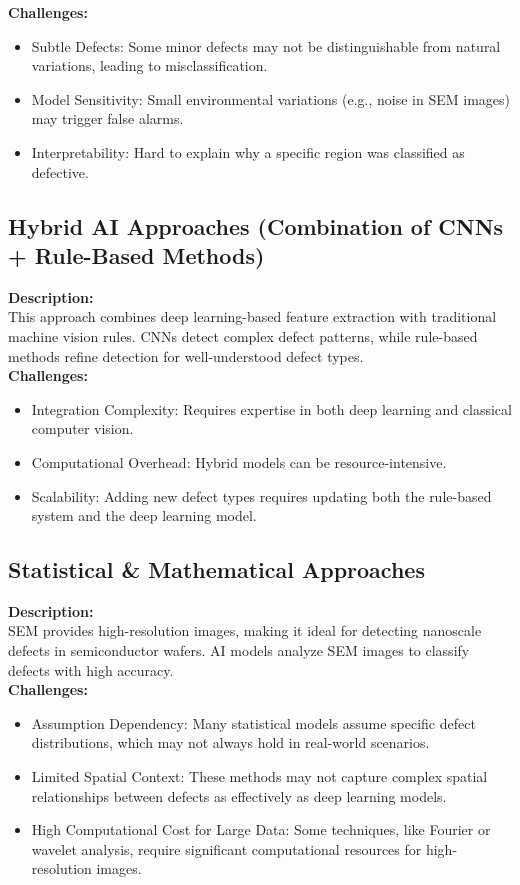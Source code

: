 \documentclass[12pt,oneside,letterpaper,english]{article}
\begin{document}
\textbf{Challenges:}
\begin{itemize}
	\item Subtle Defects: Some minor defects may not be distinguishable from natural variations, leading to misclassification.
	\item Model Sensitivity: Small environmental variations (e.g., noise in SEM images) may trigger false alarms.
	\item	Interpretability: Hard to explain why a specific region was classified as defective.
\end{itemize}

\subsection{Hybrid AI Approaches (Combination of CNNs + Rule-Based Methods)}
\textbf{Description:}\\
This approach combines deep learning-based feature extraction with traditional machine vision rules. CNNs detect complex defect patterns, while rule-based methods refine detection for well-understood defect types.\\

\textbf{Challenges:}
\begin{itemize}
	\item Integration Complexity: Requires expertise in both deep learning and classical computer vision.
	\item Computational Overhead: Hybrid models can be resource-intensive.
	\item Scalability: Adding new defect types requires updating both the rule-based system and the deep learning model.
\end{itemize}

\subsection{Statistical \& Mathematical Approaches}
\textbf{Description:}\\
SEM provides high-resolution images, making it ideal for detecting nanoscale defects in semiconductor wafers. AI models analyze SEM images to classify defects with high accuracy.\\
\newpage
\textbf{Challenges:}
\begin{itemize}
	\item Assumption Dependency: Many statistical models assume specific defect distributions, which may not always hold in real-world scenarios.
	\item Limited Spatial Context: These methods may not capture complex spatial relationships between defects as effectively as deep learning models.
	\item High Computational Cost for Large Data: Some techniques, like Fourier or wavelet analysis, require significant computational resources for high-resolution images.
\end{itemize}
\end{document}
